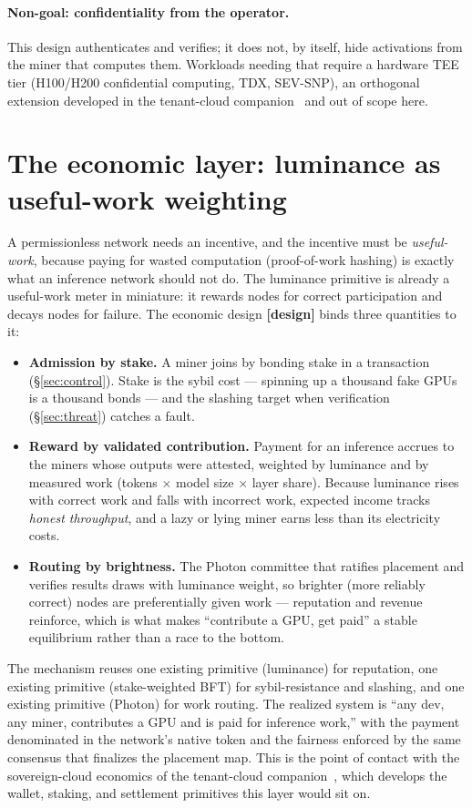 \documentclass[11pt]{article}
\newcommand{\design}{\textcolor{cmt}{\small\textbf{[design]}}}
\begin{document}
\paragraph{Non-goal: confidentiality from the operator.} This design authenticates and verifies;
it does not, by itself, hide activations from the miner that computes them. Workloads needing
that require a hardware TEE tier (H100/H200 confidential computing, TDX, SEV-SNP), an orthogonal
extension developed in the tenant-cloud companion~\cite{tenantcloud} and out of scope here.

\section{The economic layer: luminance as useful-work weighting}
\label{sec:econ}

A permissionless network needs an incentive, and the incentive must be \emph{useful-work},
because paying for wasted computation (proof-of-work hashing) is exactly what an inference
network should not do. The luminance primitive is already a useful-work meter in miniature: it
rewards nodes for correct participation and decays nodes for failure. The economic design
\design{} binds three quantities to it:
\begin{itemize}[leftmargin=1.4em,itemsep=2pt]
\item \textbf{Admission by stake.} A miner joins by bonding stake in a transaction
(\S\ref{sec:control}). Stake is the sybil cost --- spinning up a thousand fake GPUs is a
thousand bonds --- and the slashing target when verification (\S\ref{sec:threat}) catches a
fault.
\item \textbf{Reward by validated contribution.} Payment for an inference accrues to the miners
whose outputs were attested, weighted by luminance and by measured work (tokens $\times$ model
size $\times$ layer share). Because luminance rises with correct work and falls with incorrect
work, expected income tracks \emph{honest throughput}, and a lazy or lying miner earns less than
its electricity costs.
\item \textbf{Routing by brightness.} The Photon committee that ratifies placement and verifies
results draws with luminance weight, so brighter (more reliably correct) nodes are preferentially
given work --- reputation and revenue reinforce, which is what makes ``contribute a GPU, get
paid'' a stable equilibrium rather than a race to the bottom.
\end{itemize}
The mechanism reuses one existing primitive (luminance) for reputation, one existing primitive
(stake-weighted BFT) for sybil-resistance and slashing, and one existing primitive (Photon) for
work routing. The realized system is ``any dev, any miner, contributes a GPU and is paid for
inference work,'' with the payment denominated in the network's native token and the fairness
enforced by the same consensus that finalizes the placement map. This is the point of contact
with the sovereign-cloud economics of the tenant-cloud companion~\cite{tenantcloud}, which
develops the wallet, staking, and settlement primitives this layer would sit on.
\end{document}
